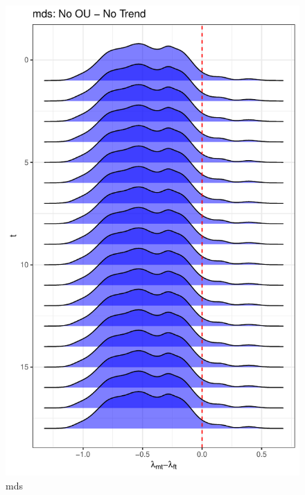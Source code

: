 \documentclass[
  12pt,
]{article}
\begin{document}
\begin{figure}

{\centering \includegraphics[width=0.9\linewidth]{../Figures/mds/lambda_diff} 

}

\caption{mds}\label{fig:unnamed-chunk-17}
\end{figure}
\end{document}
